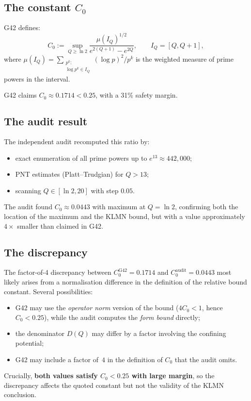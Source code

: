 \documentclass[11pt,a4paper]{article}
\begin{document}
\subsection{The constant $C_0$}

G42 defines:
\[
C_0 := \sup_{Q\ge\ln 2} \frac{\mu(I_Q)^{1/2}}{e^{2(Q+1)}-e^{2Q}}, \qquad I_Q=[Q,Q+1],
\]
where $\mu(I_Q) = \sum_{\substack{p^k:\\ \log p^k\in I_Q}} (\log p)^2 / p^k$ is the weighted measure of prime powers in the interval.

G42 claims $C_0\approx 0.1714 < 0.25$, with a 31\% safety margin.

\subsection{The audit result}

The independent audit recomputed this ratio by:
\begin{itemize}[nosep]
    \item exact enumeration of all prime powers up to $e^{13}\approx 442{,}000$;
    \item PNT estimates (Platt--Trudgian) for $Q>13$;
    \item scanning $Q\in[\ln 2, 20]$ with step $0.05$.
\end{itemize}
The audit found $C_0\approx 0.0443$ with maximum at $Q=\ln 2$, confirming both the location of the maximum and the KLMN bound, but with a value approximately $4\times$ smaller than claimed in G42.

\subsection{The discrepancy}

The factor-of-4 discrepancy between $C_0^{\text{G42}}=0.1714$ and $C_0^{\text{audit}}=0.0443$ most likely arises from a normalisation difference in the definition of the relative bound constant.  Several possibilities:
\begin{itemize}[nosep]
    \item G42 may use the \emph{operator norm} version of the bound ($4C_0<1$, hence $C_0<0.25$), while the audit computes the \emph{form bound} directly;
    \item the denominator $D(Q)$ may differ by a factor involving the confining potential;
    \item G42 may include a factor of~$4$ in the definition of $C_0$ that the audit omits.
\end{itemize}
Crucially, \textbf{both values satisfy $C_0<0.25$ with large margin}, so the discrepancy affects the quoted constant but not the validity of the KLMN conclusion.
\end{document}
